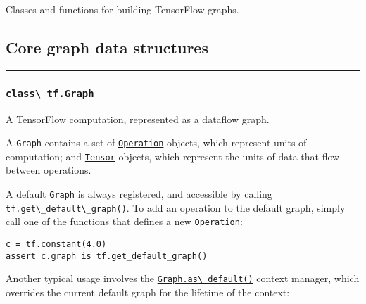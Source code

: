 Classes and functions for building TensorFlow graphs.

\subsection{Core graph data structures}\label{core-graph-data-structures}

\begin{center}\rule{0.5\linewidth}{\linethickness}\end{center}

\subsubsection{\texorpdfstring{\lstinline{class\ tf.Graph}}{class tf.Graph }}\label{class-tf.graph}

A TensorFlow computation, represented as a dataflow graph.

A \lstinline{Graph} contains a set of
\href{../../api_docs/python/framework.md\#Operation}{\lstinline{Operation}}
objects, which represent units of computation; and
\href{../../api_docs/python/framework.md\#Tensor}{\lstinline{Tensor}}
objects, which represent the units of data that flow between operations.

A default \lstinline{Graph} is always registered, and accessible by calling
\href{../../api_docs/python/framework.md\#get_default_graph}{\lstinline{tf.get\_default\_graph()}}.
To add an operation to the default graph, simply call one of the
functions that defines a new \lstinline{Operation}:

\begin{lstlisting}
c = tf.constant(4.0)
assert c.graph is tf.get_default_graph()
\end{lstlisting}

Another typical usage involves the
\href{../../api_docs/python/framework.md\#Graph.as_default}{\lstinline{Graph.as\_default()}}
context manager, which overrides the current default graph for the
lifetime of the context:

\begin{Shaded}
\begin{Highlighting}[]
\OperatorTok{=} 
 
  \OperatorTok{=} \NormalTok{)}
    
\end{Highlighting}
\end{Shaded}

